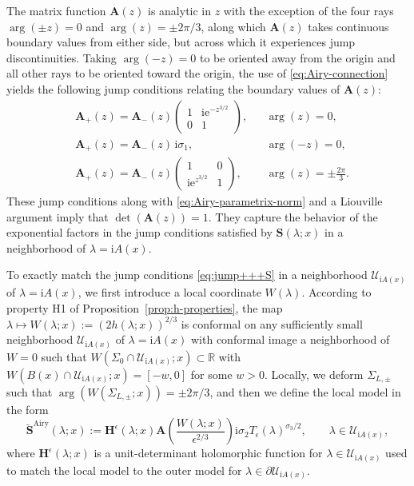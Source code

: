 \documentclass[12pt]{amsart}
\numberwithin{equation}{section}
\newcommand{\ee}{\mathrm{e}}
\newcommand{\ii}{\mathrm{i}}
\newcommand{\SP}{\lambda}
\newcommand{\R}{\mathbb{R}}
\newcommand{\eps}{\epsilon}
\begin{document}
The matrix function $\mathbf{A}(z)$ is analytic in $z$ with the exception of the four rays $\arg(\pm z)=0$ and $\arg(z)=\pm 2\pi/3$, along which  $\mathbf{A}(z)$ takes continuous boundary values from either side, but  across which it experiences jump discontinuities.  Taking $\arg(-z)=0$ to be oriented away from the origin and all other rays to be oriented toward the origin, the use of \eqref{eq:Airy-connection} yields the following jump conditions relating the boundary values of $\mathbf{A}(z)$:
\begin{equation}
\begin{aligned}
	&\mathbf{A}_+(z)=\mathbf{A}_-(z)\begin{pmatrix}1 & \ii \ee^{-z^{3/2}}\\0 & 1\end{pmatrix}, &&\arg(z)=0, \\
	&\mathbf{A}_+(z)=\mathbf{A}_-(z)\, \ii \sigma_1, &&\arg(-z)=0, \\
	&\mathbf{A}_+(z)=\mathbf{A}_-(z)\begin{pmatrix}1 & 0\\ \ii \ee^{z^{3/2}} & 1\end{pmatrix}, &&\arg(z)=\pm\frac{2\pi}{3}.
\label{eq:Airy-jumps}
\end{aligned}
\end{equation}
These jump conditions along with \eqref{eq:Airy-parametrix-norm} and a Liouville argument imply that $\det(\mathbf{A}(z))=1$.  They capture the behavior of the exponential factors in the jump conditions satisfied by $\mathbf{S}(\SP;x)$ in a neighborhood of $\SP= \ii A(x)$. 

To exactly match the jump conditions \eqref{eq:jump+++S} in a neighborhood $\mathcal{U}_{\ii A(x)}$ of $\SP =\ii A(x)$, we first introduce a local coordinate $W(\SP)$. According to property H1 of Proposition~\ref{prop:h-properties}, the map $\SP \mapsto W(\SP;x):= (2h(\SP;x))^{2/3}$ is conformal on any sufficiently small neighborhood $\mathcal{U}_{\ii A(x)}$ of $\SP = \ii A(x)$ with conformal image a neighborhood of $W =0$ such that $W(\Sigma_0 \cap \mathcal{U}_{\ii A(x)};x)  \subset \R$ with $W(B(x) \cap \mathcal{U}_{\ii A(x)};x) = [-w,0]$ for some $w>0$. Locally, we deform $\Sigma_{L,\pm}$ such that $\arg (W(\Sigma_{L,\pm};x)) = \pm 2\pi/3$, and then we define the local model in the form
\begin{equation}
	\breve{\mathbf{S}}^{\mathrm{Airy}}(\SP;x) := \mathbf{H}^\eps(\SP;x) \mathbf{A}\left( \frac{W(\lambda;x)}{\epsilon^{2/3}}
	\right) \ii\sigma_2 T_\eps(\SP)^{\sigma_3/2}, 
	\qquad \SP \in \mathcal{U}_{\ii A(x)},
\end{equation}
where $\mathbf{H}^\eps(\SP;x)$ is a unit-determinant holomorphic function for $\SP \in \mathcal{U}_{\ii A(x)}$ used to match the local model to the outer model for $\SP \in \partial \mathcal{U}_{\ii A(x)}$.
\end{document}
